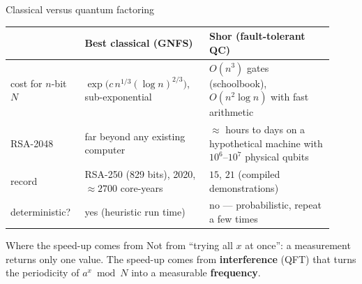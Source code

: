 \documentclass[aspectratio=169,11pt]{beamer}
\newcommand{\key}[1]{{\color{qdark}\textbf{#1}}}
\begin{document}
\begin{frame}[label=fClassVsQuantum]{Classical versus quantum factoring}
  \footnotesize
  \begin{center}
  \begin{tabular}{>{\raggedright\arraybackslash}p{0.2\linewidth}>{\raggedright\arraybackslash}p{0.36\linewidth}>{\raggedright\arraybackslash}p{0.36\linewidth}}
    \toprule & \textbf{Best classical (GNFS)} & \textbf{Shor (fault-tolerant QC)} \\ \midrule
    cost for $n$-bit $N$ & $\exp\!\big(c\,n^{1/3}(\log n)^{2/3}\big)$, sub-exponential & $O(n^3)$ gates (schoolbook), $O(n^2\log n)$ with fast arithmetic \\
    RSA-2048 & far beyond any existing computer & $\approx$ hours to days on a hypothetical machine with $10^6$--$10^7$ physical qubits \\
    record & RSA-250 (829 bits), 2020, $\approx2700$ core-years & $15$, $21$ (compiled demonstrations) \\
    deterministic? & yes (heuristic run time) & no --- probabilistic, repeat a few times \\ \bottomrule
  \end{tabular}
  \end{center}
  \begin{block}{Where the speed-up comes from}
    \small Not from ``trying all $x$ at once'': a measurement returns only one value. The speed-up comes from \key{interference} (QFT) that turns the
    periodicity of $a^x \bmod N$ into a measurable \key{frequency}.
  \end{block}
\end{frame}

\end{document}
